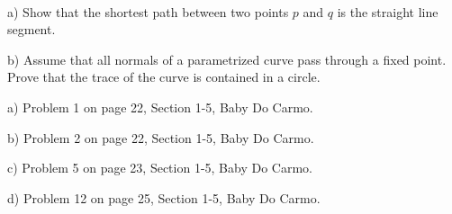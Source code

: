 \documentclass[12pt]{article}
\begin{document}
\

\begin{itemize}
	{\item a) Show that the shortest path between two points $p$ and $q$ is the straight line segment.}
	{\item b) Assume that all normals of a parametrized curve pass through a fixed point. Prove that the trace of the curve is contained in a circle. }
\end{itemize}


\begin{itemize}
{\item a) Problem 1 on page 22, Section 1-5, Baby Do Carmo.}
{\item b) Problem 2 on page 22, Section 1-5, Baby Do Carmo.}
{\item c) Problem 5 on page 23, Section 1-5, Baby Do Carmo.}
{\item d) Problem 12 on page 25, Section 1-5, Baby Do Carmo.}
\end{itemize}
\end{document}
